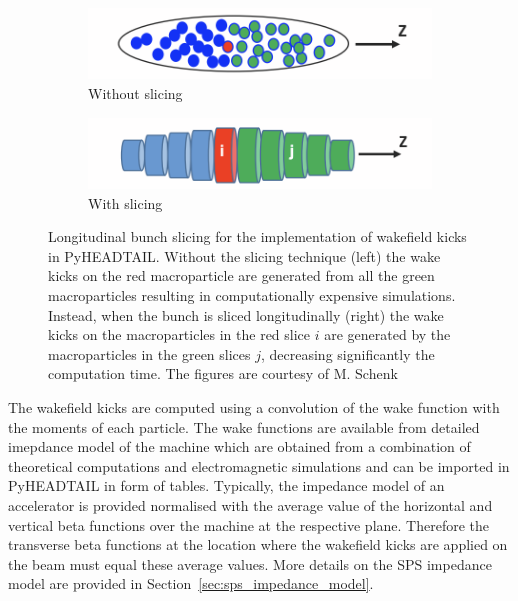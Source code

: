 {\begin{enumerate}
    \begin{figure}[!ht]
        \centering
        \begin{subfigure}[t]{0.45\textwidth}
            \centering
            \includegraphics[width=1\textwidth]{images/Ch2/before_slicing.png}
            \caption{Without slicing}
        \end{subfigure}
        \hfill
        \begin{subfigure}[t]{0.45\textwidth}
            \centering
            \includegraphics[width=1\textwidth]{images/Ch2/after_slicing.png}
            \caption{With slicing}
        \end{subfigure}
        \hfill
         \caption{Longitudinal bunch slicing for the implementation of wakefield kicks in PyHEADTAIL. Without the slicing technique (left) the wake kicks on the red macroparticle are generated from all the green macroparticles resulting in computationally expensive simulations. Instead, when the bunch is sliced longitudinally (right) the wake kicks on the macroparticles in the red slice $i$ are generated by the macroparticles in the green slices $j$, decreasing significantly the computation time. The figures are courtesy of M. Schenk~\cite{pyheadtail_schenk}} %
         \label{fig:longitudinal_slicing_wakefields}
     \end{figure}
        
    The wakefield kicks are computed using a convolution of the wake function with the moments of each particle. %
    The wake functions are available from detailed imepdance model of the machine which are obtained from a combination of theoretical computations and electromagnetic simulations and can be imported in PyHEADTAIL in form of tables. Typically, the impedance model of an accelerator is provided normalised with the average value of the horizontal and vertical beta functions over the machine at the respective plane. Therefore the transverse beta functions at the location where the wakefield kicks are applied on the beam must equal these average values. More details on the SPS impedance model are provided in Section~\ref{sec:sps_impedance_model}.
    

\end{enumerate}}
